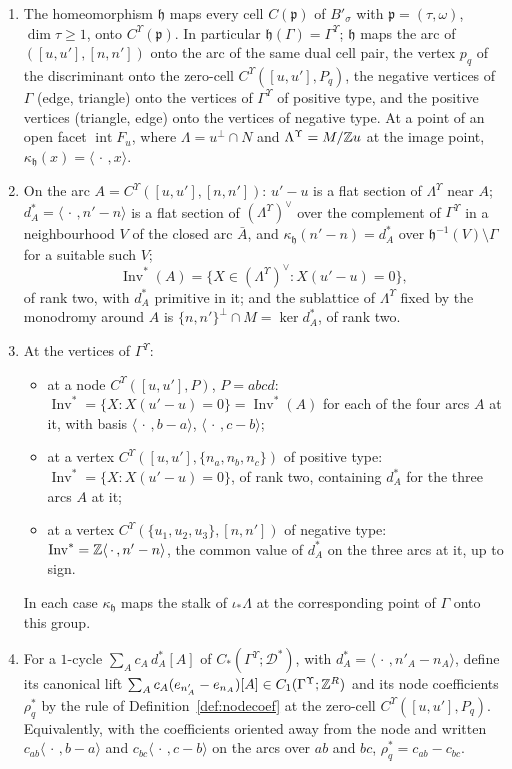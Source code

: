 \begin{proposition}\label{prop:dict}
\begin{enumerate}
\item The homeomorphism $\mathfrak h$ maps every cell $C({\mathfrak p})$ of $B'_\sigma$ with ${\mathfrak p}=(\tau,\omega)$, $\dim\tau\ge1$, onto
$C^\Upsilon({\mathfrak p})$. In particular $\mathfrak h(\Gamma)=\Gamma^\Upsilon$; $\mathfrak h$ maps the arc of $([u,u'],[n,n'])$ onto the arc of the same
dual cell pair, the vertex $p_q$ of the discriminant onto the zero-cell $C^\Upsilon([u,u'],P_q)$, the negative vertices of $\Gamma$ (edge,
triangle) onto the vertices of $\Gamma^\Upsilon$ of positive type, and the positive vertices (triangle, edge) onto the
vertices of negative type. At a point of an open facet $\operatorname{int}F_u$, where $\Lambda=u^\perp\cap N$ and
$\Lambda^\Upsilon=M/\mathbb Z u$ at the image point, $\kappa_{\mathfrak h}(x)=\langle\,\cdot\,,x\rangle$.
\item On the arc $A=C^\Upsilon([u,u'],[n,n'])$: $u'-u$ is a flat section of $\Lambda^\Upsilon$ near $A$;
$d^*_A=\langle\,\cdot\,,n'-n\rangle$ is a flat section of $(\Lambda^\Upsilon)^\vee$ over the complement of $\Gamma^\Upsilon$ in a
neighbourhood $V$ of the closed arc $\bar A$, and $\kappa_{\mathfrak h}(n'-n)=d^*_A$ over $\mathfrak h^{-1}(V)\setminus\Gamma$
for a suitable such $V$;
\[
\operatorname{Inv}^*(A)=\{X\in(\Lambda^\Upsilon)^\vee:X(u'-u)=0\},
\]
of rank two, with $d^*_A$ primitive in it; and the sublattice of $\Lambda^\Upsilon$ fixed by the monodromy around $A$ is
$\{n,n'\}^\perp\cap M=\ker d^*_A$, of rank two.
\item At the vertices of $\Gamma^\Upsilon$:
\begin{itemize}
\item at a node $C^\Upsilon([u,u'],P)$, $P=abcd$: $\operatorname{Inv}^*=\{X:X(u'-u)=0\}=\operatorname{Inv}^*(A)$ for each
of the four arcs $A$ at it, with basis $\langle\,\cdot\,,b-a\rangle$, $\langle\,\cdot\,,c-b\rangle$;
\item at a vertex $C^\Upsilon([u,u'],\{n_a,n_b,n_c\})$ of positive type: $\operatorname{Inv}^*=\{X:X(u'-u)=0\}$, of rank
two, containing $d^*_A$ for the three arcs $A$ at it;
\item at a vertex $C^\Upsilon(\{u_1,u_2,u_3\},[n,n'])$ of negative type: $\operatorname{Inv}^*=\mathbb Z\langle\,\cdot\,,n'-n\rangle$,
the common value of $d^*_A$ on the three arcs at it, up to sign.
\end{itemize}
In each case $\kappa_{\mathfrak h}$ maps the stalk of $\iota_*\Lambda$ at the corresponding point of $\Gamma$ onto this group.
\item For a $1$-cycle $\sum_Ac_A\,d^*_A[A]$ of $C_*(\Gamma^\Upsilon;\mathcal D^*)$, with $d^*_A=\langle\,\cdot\,,n'_A-n_A\rangle$,
define its canonical lift $\sum_Ac_A(e_{n'_A}-e_{n_A})[A]\in C_1(\Gamma^\Upsilon;\mathbb Z^R)$ and its node coefficients $\rho^*_q$
by the rule of Definition~\ref{def:nodecoef} at the zero-cell $C^\Upsilon([u,u'],P_q)$. Equivalently, with the coefficients
oriented away from the node and written $c_{ab}\langle\,\cdot\,,b-a\rangle$ and $c_{bc}\langle\,\cdot\,,c-b\rangle$ on the
arcs over $ab$ and $bc$, $\rho^*_q=c_{ab}-c_{bc}$.
\end{enumerate}
\end{proposition}
